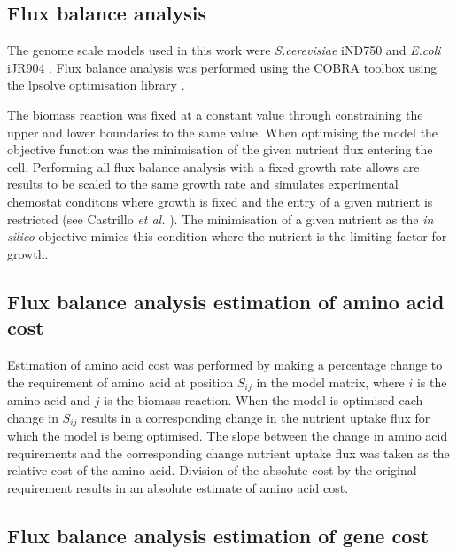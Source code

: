 \subsection{Flux balance analysis}

The genome scale models used in this work were \emph{S.cerevisiae} iND750 \cite{duarte2004a} and \emph{E.coli} iJR904 \cite{reed2003}. Flux balance analysis was performed using the COBRA toolbox \cite{becker2007} using the lpsolve optimisation library \cite{lpsolve}.

The biomass reaction was fixed at a constant value through constraining the upper and lower boundaries to the same value. When optimising the model the objective function was the minimisation of the given nutrient flux entering the cell. Performing all flux balance analysis with a fixed growth rate allows are results to be scaled to the same growth rate and simulates experimental chemostat conditons where growth is fixed and the entry of a given nutrient is restricted (see Castrillo \emph{et al.} \cite{castrillo2007}). The minimisation of a given nutrient as the \emph{in silico} objective mimics this condition where the nutrient is the limiting factor for growth.

\subsection{Flux balance analysis estimation of amino acid cost}

Estimation of amino acid cost was performed by making a percentage change to the requirement of amino acid at position $S_{ij}$ in the model matrix, where $i$ is the amino acid and $j$ is the biomass reaction. When the model is optimised each change in $S_{ij}$ results in a corresponding change in the nutrient uptake flux for which the model is being optimised. The slope between the change in amino acid requirements and the corresponding change nutrient uptake flux was taken as the relative cost of the amino acid. Division of the absolute cost by the original requirement results in an absolute estimate of amino acid cost.

\subsection{Flux balance analysis estimation of gene cost}

